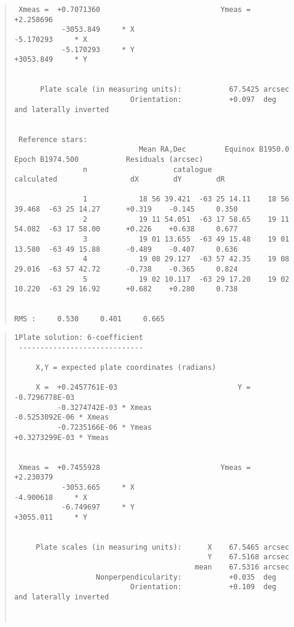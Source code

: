 \documentclass[twoside,11pt]{article}
\renewcommand{\_}{\texttt{\symbol{95}}}
\begin{document}
\begin{tiny}
\begin{quote}
\begin{verbatim}
 Xmeas =  +0.7071360                            Ymeas =   +2.258696    
           -3053.849     * X                              -5.170293     * X
           -5.170293     * Y                              +3053.849     * Y


      Plate scale (in measuring units):           67.5425 arcsec
                           Orientation:           +0.097  deg and laterally inverted


 Reference stars:
                             Mean RA,Dec         Equinox B1950.0      Epoch B1974.500           Residuals (arcsec)
                n                    catalogue                     calculated                 dX        dY        dR

                1            18 56 39.421  -63 25 14.11    18 56 39.468  -63 25 14.27      +0.319    -0.145     0.350
                2            19 11 54.051  -63 17 58.65    19 11 54.082  -63 17 58.00      +0.226    +0.638     0.677
                3            19 01 13.655  -63 49 15.48    19 01 13.580  -63 49 15.88      -0.489    -0.407     0.636
                4            19 08 29.127  -63 57 42.35    19 08 29.016  -63 57 42.72      -0.738    -0.365     0.824
                5            19 02 10.117  -63 29 17.20    19 02 10.220  -63 29 16.92      +0.682    +0.280     0.738

                                                                                  RMS :     0.530     0.401     0.665
\end{verbatim}
\end{quote}

\newpage

\begin{quote}
\begin{verbatim}
1Plate solution: 6-coefficient
 -----------------------------

     X,Y = expected plate coordinates (radians)

     X =  +0.2457761E-03                            Y =  -0.7296778E-03
          -0.3274742E-03 * Xmeas                         -0.5253092E-06 * Xmeas
          -0.7235166E-06 * Ymeas                         +0.3273299E-03 * Ymeas


 Xmeas =  +0.7455928                            Ymeas =   +2.230379    
           -3053.665     * X                              -4.900618     * X
           -6.749697     * Y                              +3055.011     * Y


     Plate scales (in measuring units):      X    67.5465 arcsec
                                             Y    67.5168 arcsec
                                          mean    67.5316 arcsec
                   Nonperpendicularity:           +0.035  deg
                           Orientation:           +0.109  deg and laterally inverted



\end{verbatim}
\end{quote}
\end{tiny}
\end{document}
